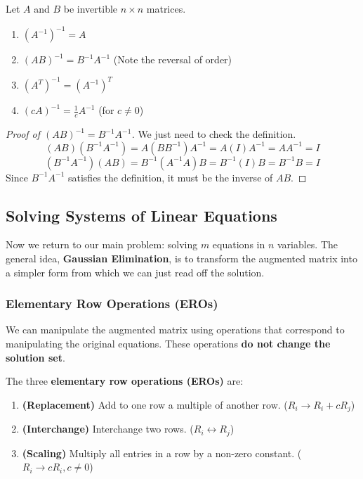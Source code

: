\documentclass[oneside]{book}
\begin{document}
\begin{property}
Let $A$ and $B$ be invertible $n \times n$ matrices.
\begin{enumerate}
    \item $(A^{-1})^{-1} = A$
    \item $(AB)^{-1} = B^{-1} A^{-1}$ (Note the reversal of order)
    \item $(A^T)^{-1} = (A^{-1})^T$
    \item $(cA)^{-1} = \frac{1}{c} A^{-1}$ (for $c \neq 0$)
\end{enumerate}
\end{property}
\begin{proof}[Proof of $(AB)^{-1} = B^{-1} A^{-1}$]
We just need to check the definition.
\[ (AB)(B^{-1} A^{-1}) = A (B B^{-1}) A^{-1} = A (I) A^{-1} = A A^{-1} = I \]
\[ (B^{-1} A^{-1})(AB) = B^{-1} (A^{-1} A) B = B^{-1} (I) B = B^{-1} B = I \]
Since $B^{-1} A^{-1}$ satisfies the definition, it must be the inverse of $AB$.
\end{proof}

\subsection{Solving Systems of Linear Equations}

Now we return to our main problem: solving $m$ equations in $n$ variables.
The general idea, \textbf{Gaussian Elimination}, is to transform the augmented matrix into a simpler form from which we can just read off the solution.

\subsubsection{Elementary Row Operations (EROs)}

We can manipulate the augmented matrix using operations that correspond to manipulating the original equations. These operations \textbf{do not change the solution set}.

\begin{definition}
The three \textbf{elementary row operations (EROs)} are:
\begin{enumerate}
    \item \textbf{(Replacement)} Add to one row a multiple of another row. ($R_i \to R_i + cR_j$)
    \item \textbf{(Interchange)} Interchange two rows. ($R_i \leftrightarrow R_j$)
    \item \textbf{(Scaling)} Multiply all entries in a row by a non-zero constant. ($R_i \to cR_i, c \neq 0$)
\end{enumerate}
\end{definition}
\end{document}
